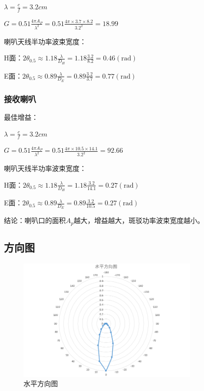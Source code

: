 \documentclass{../source/Experiment}
\begin{document}
            $\lambda = \displaystyle \frac{c}{f} = 3.2cm$

            $G=0.51 \displaystyle \frac{4 \pi A_{P}}{\lambda^{2}}=0.51 \displaystyle \frac{4 \pi \times 3.7 \times  8.2 }{3.2^{2}}=18.99$

            喇叭天线半功率波束宽度：

            H面：$2 \theta_{0.5} \approx 1.18 \displaystyle \frac{\lambda}{D_{H}}=1.18 \displaystyle \frac{3.2}{8.2}=0.46(\mathrm{rad})$

            E面：$2 \theta_{0.5} \approx 0.89 \displaystyle \frac{\lambda}{D_{E}}=0.89 \displaystyle \frac{3.2}{3.7}=0.77(\mathrm{rad})$

            \subsubsection{接收喇叭}
            最佳增益：
            
            $\lambda = \displaystyle \frac{c}{f} = 3.2cm$

            $G=0.51 \displaystyle \frac{4 \pi A_{P}}{\lambda^{2}}=0.51 \displaystyle \frac{4 \pi \times 10.5 \times  14.1 }{3.2^{2}}=92.66$

            喇叭天线半功率波束宽度：

            H面：$2 \theta_{0.5} \approx 1.18 \displaystyle \frac{\lambda}{D_{H}}=1.18 \displaystyle \frac{3.2}{14.1}=0.27(\mathrm{rad})$

            E面：$2 \theta_{0.5} \approx 0.89 \displaystyle \frac{\lambda}{D_{E}}=0.89 \displaystyle \frac{3.2}{10.5}=0.27(\mathrm{rad})$
            
            结论：喇叭口的面积$A_p$越大，增益越大，斑驳功率波束宽度越小。

        \subsection{方向图}
        
        \begin{figure}[H]
            \centering
            \includegraphics[width = 0.8\textwidth]{pic/水平.png}
            \caption{水平方向图}
        \end{figure}
\end{document}

